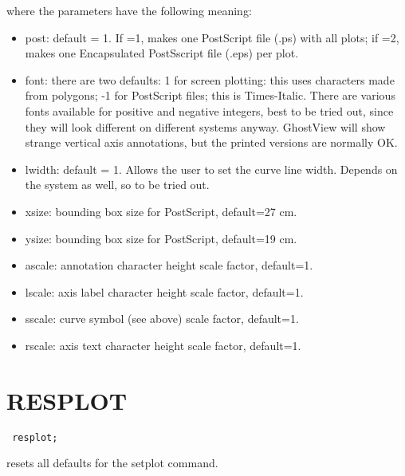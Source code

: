 where the parameters have the following meaning: 
\begin{itemize}
   \item post: default = 1. If =1, makes one PostScript file (.ps) with
     all plots; if =2, makes one Encapsulated PostSscript file (.eps)
     per plot.   
   \item font: there are two defaults: 1 for screen plotting: this uses
     characters made from polygons; -1 for PostScript files; this is
     Times-Italic. There are various fonts available for positive and
     negative integers, best to be tried out, since they will look
     different on different systems anyway. GhostView will show strange
     vertical axis annotations, but the printed versions are normally
     OK.   
   \item lwidth: default = 1. Allows the user to set the curve line
     width.  Depends on the system as well, so to be tried out.   
   \item xsize: bounding box size for PostScript, default=27 cm.   
   \item ysize: bounding box size for PostScript, default=19 cm.   
   \item ascale: annotation character height scale factor, default=1.   
   \item lscale: axis label character height scale factor, default=1.  
   \item sscale: curve symbol (see above) scale factor, default=1.  
   \item rscale: axis text character height scale factor, default=1.  
\end{itemize}


\section{RESPLOT}
\begin{verbatim}
 resplot; 
\end{verbatim} 
resets all defaults for the setplot command.  




